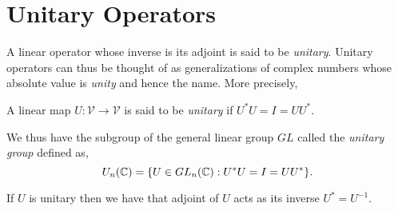 
\section{Unitary Operators} %
\label{sec:unitary}

A linear operator whose inverse is its adjoint is said to be
\emph{unitary}. Unitary operators can thus be thought of as
generalizations of complex numbers whose absolute value is
\emph{unity} and hence the name. More precisely,

\begin{defn}[Unitary]
 A linear map $U : \mathcal{V} \to \mathcal{V}$ is said to be
 \emph{unitary} if $U^{*} U = I = U U^{*}$.
\end{defn}

We thus have the subgroup of the general linear group $GL$
called the \emph{unitary group} defined as,
\[
 U_n(\mathbb{C}) = \{ U \in GL_n(\mathbb{C}) : U^{*}U = I = UU^{*} \}.
\]

\begin{cor}
 If $U$ is unitary then we have that adjoint of $U$
 acts as its inverse $U^{*}=U^{-1}$.
\end{cor}
